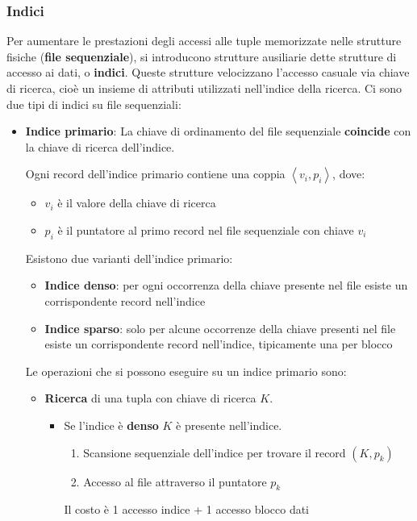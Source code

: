 \documentclass[a4paper,twoside]{article}
\begin{document}
\subsubsection{Indici}
Per aumentare le prestazioni degli accessi alle tuple memorizzate nelle strutture
fisiche (\textbf{file sequenziale}), si introducono strutture ausiliarie dette
strutture di accesso ai dati, o \textbf{indici}. Queste strutture velocizzano l'accesso
casuale via chiave di ricerca, cioè un insieme di attributi utilizzati nell'indice
della ricerca. Ci sono due tipi di indici su file sequenziali:
\begin{itemize}
  \item \textbf{Indice primario}: La chiave di ordinamento del file sequenziale 
    \textbf{coincide} con la chiave di ricerca dell'indice.

    Ogni record dell'indice primario contiene una coppia \( \left<v_i, p_i \right> \),
    dove:
    \begin{itemize}
      \item \( v_i \) è il valore della chiave di ricerca
      \item \( p_i \) è il puntatore al primo record nel file sequenziale con chiave
        \( v_i \) 
    \end{itemize}
    Esistono due varianti dell'indice primario:
    \begin{itemize}
      \item \textbf{Indice denso}: per ogni occorrenza della chiave presente nel file
        esiste un corrispondente record nell'indice

      \item \textbf{Indice sparso}: solo per alcune occorrenze della chiave presenti
        nel file esiste un corrispondente record nell'indice, tipicamente una per
        blocco
    \end{itemize}

    Le operazioni che si possono eseguire su un indice primario sono:
    \begin{itemize}
      \item \textbf{Ricerca} di una tupla con chiave di ricerca \( K \).
        \begin{itemize}
          \item Se l'indice è \textbf{denso} \( K \) è presente nell'indice.
            \begin{enumerate}
              \item Scansione sequenziale dell'indice per trovare il record \( \left(K, p_k\right) \)
              \item Accesso al file attraverso il puntatore \( p_k \)
            \end{enumerate}
            Il costo è 1 accesso indice + 1 accesso blocco dati


\end{itemize}
\end{itemize}
\end{itemize}
\end{document}

